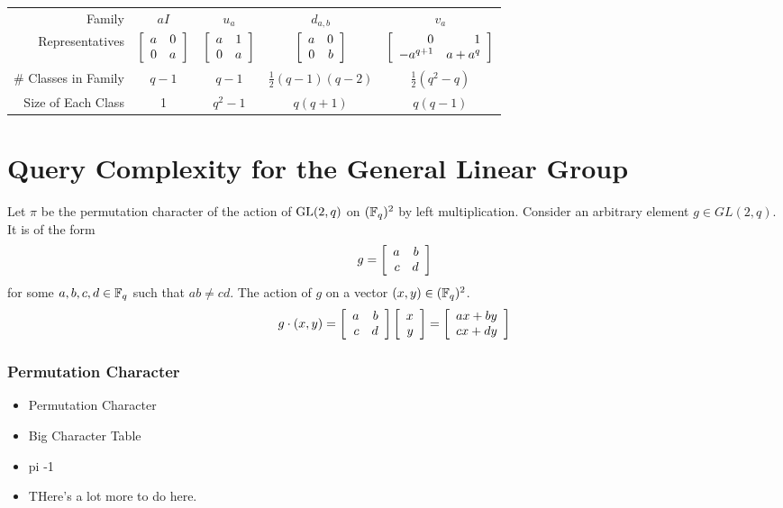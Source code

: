 \begin{center}
\begin{tabular}{r|cccc}
    Family & \vphantom{\Bigg|} $aI$ & $u_a$ & $d_{a,b}$ & $v_a$  \\
    \vphantom{\Bigg|}Representatives & $ \left[\begin{array}{rr}a&0\\0&a\end{array}\right]$ & $ \left[\begin{array}{rr}a&1\\0&a\end{array}\right]$ & $ \left[\begin{array}{rr}a&0\\0&b\end{array}\right] $ & $ 
    \left[\begin{array}{rr}0&1\\-a^{q+1}&a + a^q\end{array}\right]$ \\
\# Classes in Family & \vphantom{\Bigg|}$q-1$ & $q-1$ & $\frac{1}{2}(q-1)(q-2)$ & $\frac{1}{2}(q^2 -q)$ \\
\vphantom{\Bigg|} Size of Each Class & 1 & $q^2 - 1$ & $q(q+1)$ & $q(q-1)$
\end{tabular}
\end{center}




\section{Query Complexity for the General Linear Group}

Let $\pi$ be the permutation character of the action of $\operatorname{GL}(2, q)$ on $(\mathbb{F}_q)^2$ by left multiplication. Consider 
an arbitrary element $g \in GL(2,q)$. It is of the form
\[
    g = \left[\begin{array}{rr}a&b\\c&d\end{array}\right]
\]
for some $a,b,c,d \in \mathbb{F}_q$ such that $ab \neq cd$. The action of $g$ on a vector $(x,y) \in (\mathbb{F}_q)^2$.
\[
    g\cdot(x,y) = \left[\begin{array}{rr}a&b\\c&d\end{array}\right] \left[\begin{array}{r}x\\y\end{array}\right] = \left[\begin{array}{r}ax + by\\cx + dy\end{array}\right]
\]

    
\subsubsection{Permutation Character}




\begin{itemize}
    \item Permutation Character
    \item Big Character Table
    \item pi -1
    \item THere's a lot more to do here.
\end{itemize}



 


